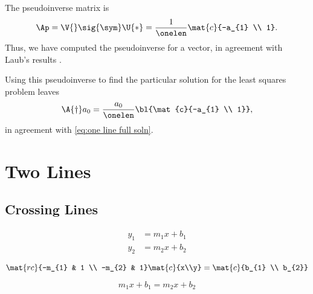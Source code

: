 The pseudoinverse matrix is
  \begin{equation*}   %
      \Ap = \V{} \sig{\sym} \U{*} = \frac{1} {\onelen} \mat{c}{-a_{1} \\ 1}.
  \end{equation*}
Thus, we have computed the pseudoinverse for a vector, in agreement with Laub's results .

Using this pseudoinverse to find the particular solution for the least squares problem leaves
  \begin{equation}   %
      \A{\dagger} a_{0} = \frac{a_{0}}{\onelen} \bl{\mat{c}{-a_{1} \\ 1}},
   \label{eq:one line soln}
  \end{equation}
in agreement with \eqref{eq:one line full soln}.

\section{Two Lines}  %

\subsection{Crossing Lines}  %

  \begin{equation*}   %
    \begin{split}
      y_{1} &= m_{1}x + b_{1} \\
      y_{2} &= m_{2}x + b_{2}
    \end{split}
  \end{equation*}

  \begin{equation*}   %
    \mat{rc}{-m_{1} & 1 \\ -m_{2} & 1} \mat{c}{x\\y} = \mat{c}{b_{1} \\ b_{2}}
  \end{equation*}

  \begin{equation*}   %
    m_{1} x + b_{1} = m_{2} x + b_{2}
  \end{equation*}

